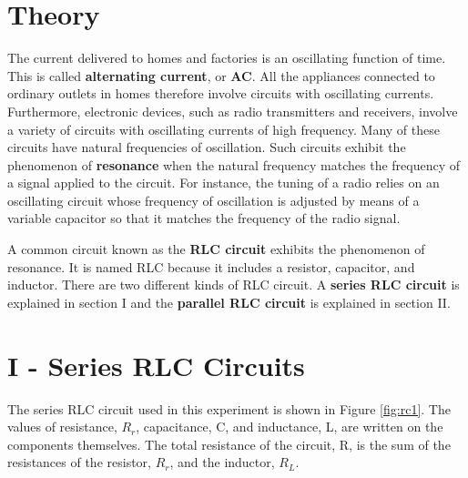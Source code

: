 \section{Theory}
The current delivered to homes and factories is an oscillating function of time. This is called {\bf alternating current}, or {\bf AC}. All the appliances connected to ordinary outlets in homes therefore involve circuits with oscillating currents. Furthermore, electronic devices, such as radio transmitters and receivers, involve a variety of circuits with oscillating currents of high frequency. Many of these circuits have natural frequencies of oscillation. Such circuits exhibit the phenomenon of {\bf resonance} when the natural frequency matches the frequency of a signal applied to the circuit. For instance, the tuning of a radio relies on an oscillating circuit whose frequency of oscillation is adjusted by means of a variable capacitor so that it matches the frequency of the radio signal.

A common circuit known as the {\bf RLC circuit} exhibits the phenomenon of resonance. It is named RLC because it includes a resistor, capacitor, and inductor. There are two different kinds of RLC circuit. A {\bf series RLC circuit} is explained in section I and the {\bf parallel RLC circuit} is explained in section II.

\section{I - Series RLC Circuits}
The series RLC circuit used in this experiment is shown in Figure \ref{fig:rc1}. The values of resistance, $R_r$, capacitance, C, and inductance, L, are written on the components themselves. The total resistance of the circuit, R, is the sum of the resistances of the resistor, $R_r$, and the inductor, $R_L$.


